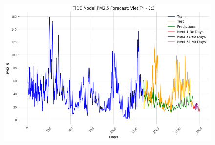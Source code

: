 \begin{figure}[H]
\begin{minipage}{0.15\textwidth}
        \centering
        \includegraphics[width=1\textwidth]{img/final/TiDE/90D/TiDE_7_3_VT.png}
        \end{minipage}
        \hfill


\end{figure}
